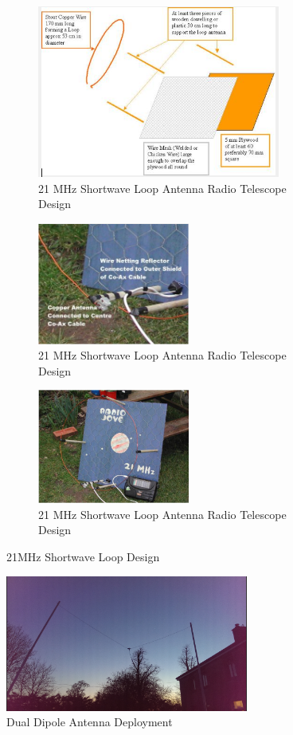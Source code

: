 \documentclass[runningheads,a4paper]{llncs}
\begin{document}
%
\begin{figure}	
	\centering
	\begin{subfigure}[t]{8cm}
		\centering
		\includegraphics[width=8cm]{images/14}
		\caption{21 MHz Shortwave Loop Antenna Radio Telescope Design \citep{greef-12}}\label{fig:loop_antenna_design_a}		
	\end{subfigure}
	\quad
	\begin{subfigure}[t]{5cm}
		\centering
		\includegraphics[width=5cm]{images/16}
		\caption{21 MHz Shortwave Loop Antenna Radio Telescope Design \citep{greef-12}}\label{fig:loop_antenna_design_b}
	\end{subfigure}
	\quad
	\begin{subfigure}[t]{5cm}
		\centering
		\includegraphics[width=5cm]{images/15}
		\caption{21 MHz Shortwave Loop Antenna Radio Telescope Design \citep{greef-12}}\label{fig:loop_antenna_design_c}
	\end{subfigure}
	\caption{21MHz Shortwave Loop Design}\label{fig:loop_antenna_design}
\end{figure}
%

%
\begin{figure}[here]
\centering
\includegraphics[width=8cm]{images/32}
\caption{Dual Dipole Antenna Deployment}
\label{fig:dual_dipole_deployed}
\end{figure}
%
\end{document}
